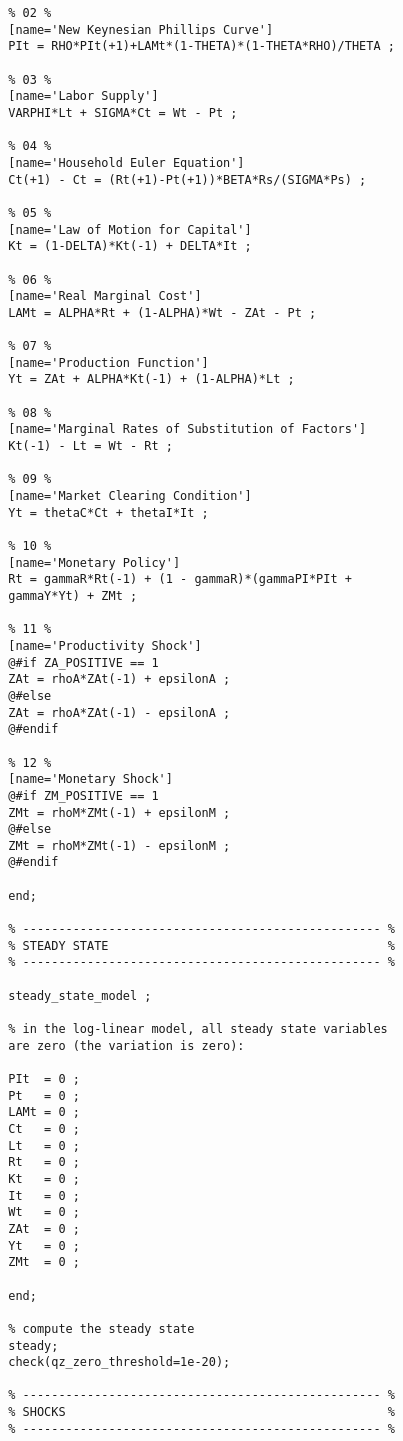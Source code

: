 \documentclass[
thesis.tex
]{subfiles}
\begin{document}
{\begin{verbatim}
		% 02 %
		[name='New Keynesian Phillips Curve']
		PIt = RHO*PIt(+1)+LAMt*(1-THETA)*(1-THETA*RHO)/THETA ;
		
		% 03 %
		[name='Labor Supply']
		VARPHI*Lt + SIGMA*Ct = Wt - Pt ;
		
		% 04 %
		[name='Household Euler Equation']
		Ct(+1) - Ct = (Rt(+1)-Pt(+1))*BETA*Rs/(SIGMA*Ps) ;
		
		% 05 %
		[name='Law of Motion for Capital']
		Kt = (1-DELTA)*Kt(-1) + DELTA*It ;
		
		% 06 %
		[name='Real Marginal Cost']
		LAMt = ALPHA*Rt + (1-ALPHA)*Wt - ZAt - Pt ;
		
		% 07 %
		[name='Production Function']
		Yt = ZAt + ALPHA*Kt(-1) + (1-ALPHA)*Lt ;
		
		% 08 %
		[name='Marginal Rates of Substitution of Factors']
		Kt(-1) - Lt = Wt - Rt ;
		
		% 09 %
		[name='Market Clearing Condition']
		Yt = thetaC*Ct + thetaI*It ;
		
		% 10 %
		[name='Monetary Policy']
		Rt = gammaR*Rt(-1) + (1 - gammaR)*(gammaPI*PIt + 
		gammaY*Yt) + ZMt ;
		
		% 11 %
		[name='Productivity Shock']
		@#if ZA_POSITIVE == 1
		ZAt = rhoA*ZAt(-1) + epsilonA ;
		@#else
		ZAt = rhoA*ZAt(-1) - epsilonA ;
		@#endif
		
		% 12 %
		[name='Monetary Shock']
		@#if ZM_POSITIVE == 1
		ZMt = rhoM*ZMt(-1) + epsilonM ;
		@#else
		ZMt = rhoM*ZMt(-1) - epsilonM ;
		@#endif
		
		end;
		
		% -------------------------------------------------- % 
		% STEADY STATE                                       %
		% -------------------------------------------------- % 
		
		steady_state_model ;
		
		% in the log-linear model, all steady state variables
		are zero (the variation is zero):
		
		PIt  = 0 ;
		Pt   = 0 ;
		LAMt = 0 ;
		Ct   = 0 ;
		Lt   = 0 ;
		Rt   = 0 ;
		Kt   = 0 ;
		It   = 0 ;
		Wt   = 0 ;
		ZAt  = 0 ;
		Yt   = 0 ;
		ZMt  = 0 ;
		
		end;
		
		% compute the steady state
		steady;
		check(qz_zero_threshold=1e-20);
		
		% -------------------------------------------------- % 
		% SHOCKS                                             %
		% -------------------------------------------------- % 
		

\end{verbatim}}
\end{document}
